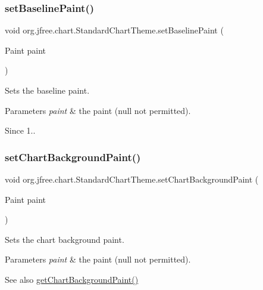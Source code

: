 \subsubsection{\texorpdfstring{set\+Baseline\+Paint()}{setBaselinePaint()}}
{\footnotesize\ttfamily void org.\+jfree.\+chart.\+Standard\+Chart\+Theme.\+set\+Baseline\+Paint (\begin{DoxyParamCaption}\item[{Paint}]{paint }\end{DoxyParamCaption})}

Sets the baseline paint.


\begin{DoxyParams}{Parameters}
{\em paint} & the paint ({\ttfamily null} not permitted).\\
\hline
\end{DoxyParams}
\begin{DoxySince}{Since}
1.. 
\end{DoxySince}
\mbox{\label{classorg_1_1jfree_1_1chart_1_1_standard_chart_theme_ad3c8891779ca58e4e3d22a9a2a5f84fa}} 
\subsubsection{\texorpdfstring{set\+Chart\+Background\+Paint()}{setChartBackgroundPaint()}}
{\footnotesize\ttfamily void org.\+jfree.\+chart.\+Standard\+Chart\+Theme.\+set\+Chart\+Background\+Paint (\begin{DoxyParamCaption}\item[{Paint}]{paint }\end{DoxyParamCaption})}

Sets the chart background paint.


\begin{DoxyParams}{Parameters}
{\em paint} & the paint ({\ttfamily null} not permitted).\\
\hline
\end{DoxyParams}
\begin{DoxySeeAlso}{See also}
\mbox{\hyperlink{classorg_1_1jfree_1_1chart_1_1_standard_chart_theme_a282a85722cb384c3a745c15e6ef5cf02}{get\+Chart\+Background\+Paint()}} 
\end{DoxySeeAlso}
\mbox{\label{classorg_1_1jfree_1_1chart_1_1_standard_chart_theme_a6e79ffa1bd9080dcc334f9cd3cb4821a}} 
